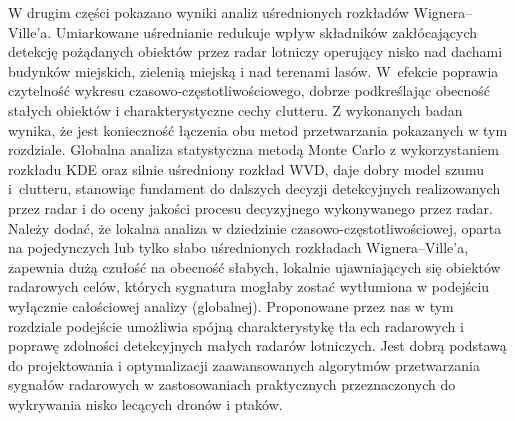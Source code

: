 W drugim części pokazano wyniki analiz uśrednionych rozkładów Wignera--Ville'a. Umiarkowane uśrednianie redukuje wpływ składników zakłócających detekcję pożądanych obiektów przez radar lotniczy operujący nisko nad dachami budynków miejskich, zielenią miejską i nad terenami lasów. W~efekcie poprawia czytelność wykresu czasowo-częstotliwościowego, dobrze podkreślając obecność stałych obiektów i charakterystyczne cechy clutteru. 
Z wykonanych badan wynika, że jest konieczność łączenia obu metod przetwarzania pokazanych w tym rozdziale. Globalna analiza statystyczna metodą Monte Carlo z wykorzystaniem rozkładu KDE oraz silnie uśredniony rozkład WVD, daje dobry model szumu i~clutteru, stanowiąc fundament do dalszych decyzji detekcyjnych realizowanych przez radar i do oceny jakości procesu decyzyjnego wykonywanego przez radar. Należy dodać, że lokalna analiza w dziedzinie czasowo-częstotliwościowej, oparta na pojedynczych lub tylko słabo uśrednionych rozkładach Wignera--Ville'a, zapewnia dużą czułość na obecność słabych, lokalnie ujawniających się obiektów radarowych celów, których sygnatura mogłaby zostać wytłumiona w podejściu wyłącznie całościowej analizy (globalnej). 
Proponowane przez nas w tym rozdziale podejście umożliwia spójną charakterystykę tła ech radarowych i poprawę zdolności detekcyjnych małych radarów lotniczych. Jest dobrą podstawą do projektowania i optymalizacji zaawansowanych algorytmów przetwarzania sygnałów radarowych w zastosowaniach praktycznych przeznaczonych do wykrywania nisko lecących dronów i ptaków.





